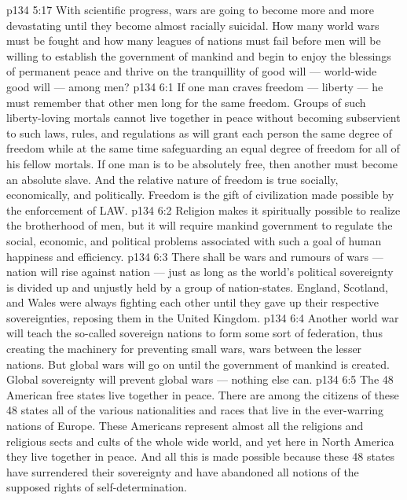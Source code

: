 \vs p134 5:17 With scientific progress, wars are going to become more and more devastating until they become almost racially suicidal. How many world wars must be fought and how many leagues of nations must fail before men will be willing to establish the government of mankind and begin to enjoy the blessings of permanent peace and thrive on the tranquillity of good will --- world\hyp{}wide good will --- among men?
\vs p134 6:1 If one man craves freedom --- liberty --- he must remember that  other men long for the same freedom. Groups of such liberty\hyp{}loving mortals cannot live together in peace without becoming subservient to such laws, rules, and regulations as will grant each person the same degree of freedom while at the same time safeguarding an equal degree of freedom for all of his fellow mortals. If one man is to be absolutely free, then another must become an absolute slave. And the relative nature of freedom is true socially, economically, and politically. Freedom is the gift of civilization made possible by the enforcement of LAW.
\vs p134 6:2 Religion makes it spiritually possible to realize the brotherhood of men, but it will require mankind government to regulate the social, economic, and political problems associated with such a goal of human happiness and efficiency.
\vs p134 6:3 There shall be wars and rumours of wars --- nation will rise against nation --- just as long as the world’s political sovereignty is divided up and unjustly held by a group of nation\hyp{}states. England, Scotland, and Wales were always fighting each other until they gave up their respective sovereignties, reposing them in the United Kingdom.
\vs p134 6:4 Another world war will teach the so\hyp{}called sovereign nations to form some sort of federation, thus creating the machinery for preventing small wars, wars between the lesser nations. But global wars will go on until the government of mankind is created. Global sovereignty will prevent global wars --- nothing else can.
\vs p134 6:5 The 48 American free states live together in peace. There are among the citizens of these 48 states all of the various nationalities and races that live in the ever\hyp{}warring nations of Europe. These Americans represent almost all the religions and religious sects and cults of the whole wide world, and yet here in North America they live together in peace. And all this is made possible because these 48 states have surrendered their sovereignty and have abandoned all notions of the supposed rights of self\hyp{}determination.
